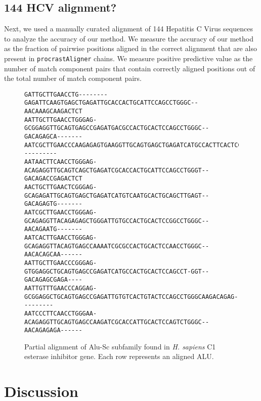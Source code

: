 \documentclass{ws-procs9x6}
\begin{document}
\subsection{144 HCV alignment? }
Next, we used a manually curated alignment of 144 Hepatitis C Virus sequences~\cite{ref-hcvdb} to analyze the
accuracy of our method.  We measure the
accuracy of our method as the fraction of pairwise
positions aligned in the correct alignment that are also present in
\texttt{procrastAligner} chains.  We measure positive predictive
value as the number of match component pairs that contain correctly
aligned positions out of the total number of match component pairs.


\begin{figure}[t]
\scriptsize
\begin{verbatim}
GATTGCTTGAACCTG--------GAGATTCAAGTGAGCTGAGATTGCACCACTGCATTCCAGCCTGGGC--AACAAAGCAAGACTCT
AATTGCTTGAACCTGGGAG-GCGGAGGTTGCAGTGAGCCGAGATGACGCCACTGCACTCCAGCCTGGGC--GACAGAGCA-------
AATCGCTTGAACCCAAGAGAGTGAAGGTTGCAGTGAGCTGAGATCATGCCACTTCACTCCAGCCTGAGTGAAACAGC----------
AATAACTTCAACCTGGGAG-ACAGAGGTTGCAGTCAGCTGAGATCGCACCACTGCATTCCAGCCTGGGT--GACAGACCGAGACTCT
AACTGCTTGAACTCGGGAG-GCAGAGATTGCAGTGAGCTGAGATCATGTCAATGCACTGCAGCTTGAGT--GACAGAGTG-------
AATCGCTTGAACCTGGGAG-GCAGAGGTTACAGAGAGCTGGGATTGTGCCACTGCACTCCGGCCTGGGC--AACAGAATG-------
AATCACTTGAACCTGGGAG-GCAGAGGTTACAGTGAGCCAAAATCGCGCCACTGCACTCCAACCTGGGC--AACACAGCAA------
AATTGCTTGAACCCGGGAG-GTGGAGGCTGCAGTGAGCCGAGATCATGCCACTGCACTCCAGCCT-GGT--GACAGAGCGAGA----
AATTGTTTGAACCCAGGAG-GCGGAGGCTGCAGTGAGCCGAGATTGTGTCACTGTACTCCAGCCTGGGCAAGACAGAG---------
AATCCCTTCAACCTGGGAA-ACAGAGGTTGCAGTGAGCCAAGATCGCACCATTGCACTCCAGTCTGGGC--AACAGAGAGA------
\end{verbatim}
\normalsize
\caption{Partial alignment of Alu-Sc subfamily found in \emph{H. sapiens} C1 esterase inhibitor gene. Each row represents an aligned ALU.}
\label{fig-align}
\end{figure}

\section{Discussion}
\end{document}
